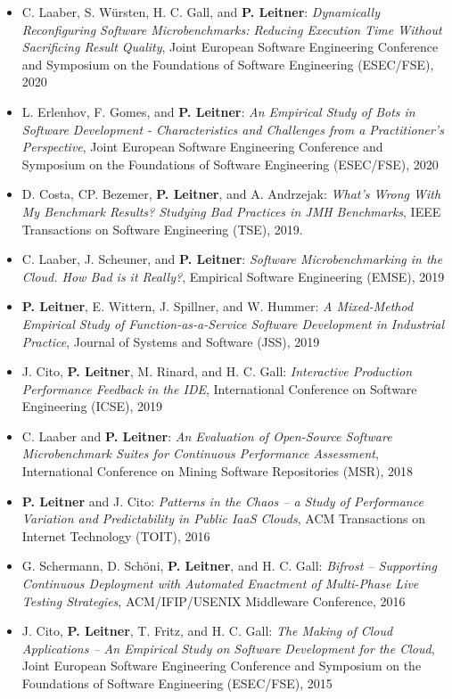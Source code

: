 \documentclass[paper=letter,fontsize=11pt]{scrartcl} %
\begin{document}
\begin{itemize}
\item C. Laaber,  S. W\"ursten, H. C. Gall, and \textbf{P. Leitner}: \emph{Dynamically Reconfiguring Software Microbenchmarks: Reducing Execution Time Without Sacrificing Result Quality}, Joint European Software Engineering Conference and Symposium on the Foundations of Software Engineering (ESEC/FSE), 2020
\item L. Erlenhov,  F. Gomes, and \textbf{P. Leitner}: \emph{An Empirical Study of Bots in Software Development - Characteristics and Challenges from a Practitioner's Perspective}, Joint European Software Engineering Conference and Symposium on the Foundations of Software Engineering (ESEC/FSE), 2020
	\item D. Costa, CP. Bezemer, \textbf{P. Leitner}, and  A. Andrzejak: \emph{What's Wrong With My Benchmark Results? Studying Bad Practices in JMH Benchmarks}, IEEE Transactions on Software Engineering (TSE), 2019.
		\item  C. Laaber, J. Scheuner, and \textbf{P. Leitner}: \emph{Software Microbenchmarking in the Cloud. How Bad is it Really?}, Empirical Software Engineering (EMSE), 2019
	\item \textbf{P. Leitner}, E. Wittern, J. Spillner, and W. Hummer: \emph{A Mixed-Method Empirical Study of Function-as-a-Service Software Development in Industrial Practice}, Journal of Systems and Software (JSS), 2019
	\item J. Cito, \textbf{P. Leitner}, M. Rinard, and H. C. Gall: \emph{Interactive Production Performance Feedback in the IDE}, International Conference on Software Engineering (ICSE),  2019
	\item C. Laaber and \textbf{P. Leitner}: \emph{An Evaluation of Open-Source Software Microbenchmark Suites for Continuous Performance Assessment}, International Conference on Mining Software Repositories (MSR), 2018	
  \item  \textbf{P. Leitner} and J. Cito: \emph{Patterns in the Chaos -- a Study of Performance Variation and Predictability in Public IaaS Clouds}, ACM Transactions on Internet Technology (TOIT), 2016
  	\item G. Schermann, D. Sch\"oni, \textbf{P. Leitner}, and H. C. Gall: \emph{Bifrost -- Supporting Continuous Deployment with Automated Enactment of Multi-Phase Live Testing Strategies}, ACM/IFIP/USENIX Middleware Conference, 2016
        \item J. Cito, \textbf{P. Leitner}, T. Fritz, and H. C. Gall: \emph{The Making of Cloud Applications -- An Empirical Study on Software Development for the Cloud}, Joint European Software Engineering Conference and Symposium on the Foundations of Software Engineering (ESEC/FSE), 2015
\end{itemize}
\end{document}
